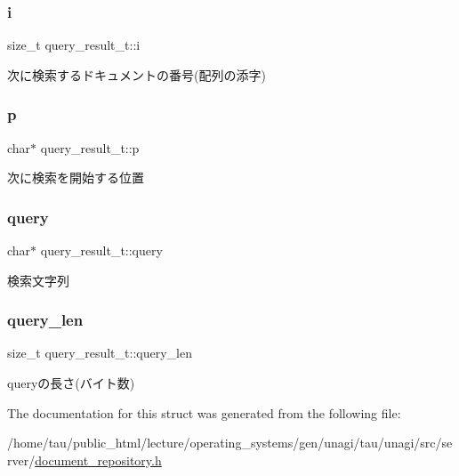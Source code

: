 \subsubsection{\texorpdfstring{i}{i}}
{\footnotesize\ttfamily size\+\_\+t query\+\_\+result\+\_\+t\+::i}

次に検索するドキュメントの番号(配列の添字) \mbox{\label{structquery__result__t_ad44a1b8a87775c59260626095bb42945}} 
\subsubsection{\texorpdfstring{p}{p}}
{\footnotesize\ttfamily char$\ast$ query\+\_\+result\+\_\+t\+::p}

次に検索を開始する位置 \mbox{\label{structquery__result__t_aa5f0530418fd600f6fb0af7ba32028bc}} 
\subsubsection{\texorpdfstring{query}{query}}
{\footnotesize\ttfamily char$\ast$ query\+\_\+result\+\_\+t\+::query}

検索文字列 \mbox{\label{structquery__result__t_a2b862804a4bde653fa85acdf84ae0403}} 
\subsubsection{\texorpdfstring{query\+\_\+len}{query\_len}}
{\footnotesize\ttfamily size\+\_\+t query\+\_\+result\+\_\+t\+::query\+\_\+len}

queryの長さ(バイト数) 

The documentation for this struct was generated from the following file\+:\begin{DoxyCompactItemize}
\item 
/home/tau/public\+\_\+html/lecture/operating\+\_\+systems/gen/unagi/tau/unagi/src/server/\hyperlink{document__repository_8h}{document\+\_\+repository.\+h}\end{DoxyCompactItemize}
